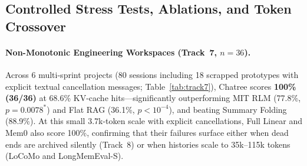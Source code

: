 \documentclass[10pt,twocolumn]{article}
\begin{document}
\subsection{Controlled Stress Tests, Ablations, and Token Crossover}

\paragraph{Non-Monotonic Engineering Workspaces (Track~7, $n=36$).}
Across 6 multi-sprint projects (80 sessions including 18 scrapped prototypes with explicit textual cancellation messages; Table~\ref{tab:track7}), Chatree scores \textbf{100\% (36/36)} at 68.6\% KV-cache hits—significantly outperforming MIT RLM (77.8\%, $p=0.0078^*$) and Flat RAG (36.1\%, $p<10^{-4}$), and beating Summary Folding (88.9\%). At this small 3.7k-token scale with explicit cancellations, Full Linear and Mem0 also score 100\%, confirming that their failures surface either when dead ends are archived silently (Track~8) or when histories scale to 35k--115k tokens (LoCoMo and LongMemEval-S).

\begin{table}[t]
\centering
\caption{Track~7 engineering spec-reversal benchmark ($n=36$, 80 sessions across 6 projects; commit \texttt{7437589}). $^*$ denotes $p < 0.05$ vs.\ Chatree.}
\label{tab:track7}
\scriptsize
\setlength{\tabcolsep}{2.6pt}
\end{table}
\end{document}
